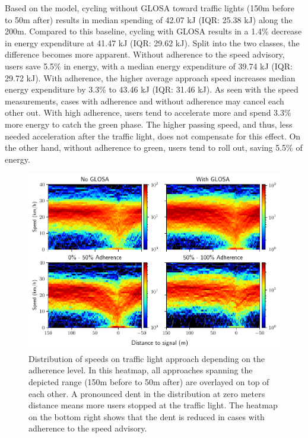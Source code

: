 Based on the model, cycling without GLOSA toward traffic lights (150m before to 50m after) results in median spending of 42.07 kJ (IQR: 25.38 kJ) along the 200m. Compared to this baseline, cycling with GLOSA results in a 1.4\% decrease in energy expenditure at 41.47 kJ (IQR: 29.62 kJ). Split into the two classes, the difference becomes more apparent. Without adherence to the speed advisory, users save 5.5\% in energy, with a median energy expenditure of 39.74 kJ (IQR: 29.72 kJ). With adherence, the higher average approach speed increases median energy expenditure by 3.3\% to 43.46 kJ (IQR: 31.46 kJ). As seen with the speed measurements, cases with adherence and without adherence may cancel each other out. With high adherence, users tend to accelerate more and spend 3.3\% more energy to catch the green phase. The higher passing speed, and thus, less needed acceleration after the traffic light, does not compensate for this effect. On the other hand, without adherence to green, users tend to roll out, saving 5.5\% of energy.

\begin{figure}[t]
\caption{Distribution of speeds on traffic light approach depending on the adherence level. In this heatmap, all approaches spanning the depicted range (150m before to 50m after) are overlayed on top of each other. A pronounced dent in the distribution at zero meters distance means more users stopped at the traffic light. The heatmap on the bottom right shows that the dent is reduced in cases with adherence to the speed advisory.}\label{fig:impacts-approach-speed-heatmap}
\includegraphics[width=\linewidth]{images/impacts-approach-speed-heatmap.pdf}
\end{figure}

